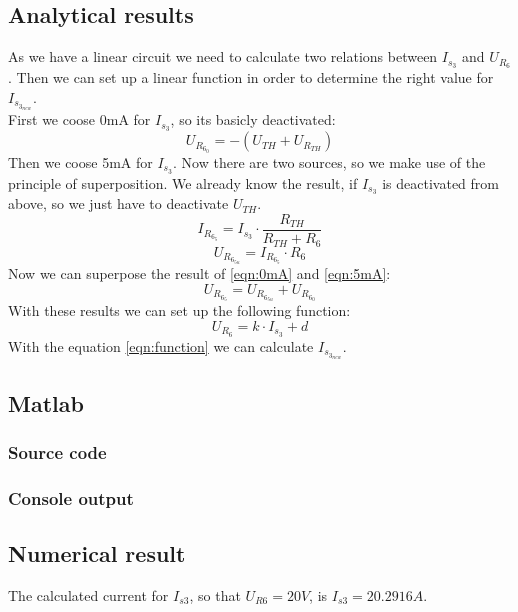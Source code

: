 \documentclass[a4paper]{article}
\begin{document}
\subsection{Analytical results}
As we have a linear circuit we need to calculate two relations between $I_{s_3}$ and $U_{R_6}$.
Then we can set up a linear function in order to determine the right value for $I_{s_{3_{new}}}$.\\
First we coose 0mA for $I_{s_3}$, so its basicly deactivated:
\begin{equation}
      U_{R_{6_0}} = -(U_{TH} + U_{R_{TH}})
\end{equation}\label{eqn:0mA}
Then we coose 5mA for $I_{s_3}$. Now there are two sources, so we make use of the principle of
superposition. We already know the result, if $I_{s_3}$ is deactivated from above, so we 
just have to deactivate $U_{TH}$.
\begin{equation*}
      I_{R_{6_5}} = I_{s_3} \cdot \frac{R_{TH}}{R_{TH} + R_6}
\end{equation*}
\begin{equation}
      U_{R_{6_{5u}}} = I_{R_{6_5}} \cdot R_6
\end{equation}\label{eqn:5mA}
Now we can superpose the result of \ref{eqn:0mA} and \ref{eqn:5mA}:
\begin{equation}
      U_{R_{6_5}} = U_{R_{6_{5u}}} + U_{R_{6_0}}
\end{equation}
With these results we can set up the following function:
\begin{equation}\label{eqn:function}
      U_{R_{6}} = k \cdot I_{s_{3}} + d
\end{equation}
With the equation \ref{eqn:function} we can calculate $I_{s_{3_{new}}}$.
\subsection{Matlab}
\subsubsection{Source code}
  
\subsubsection{Console output}
  
\vspace{2mm}
\subsection{Numerical result}
The calculated current for $I_{s3}$, so that $U_{R6} = 20V$, is $I_{s3} = 20.2916 A$.
\end{document}
